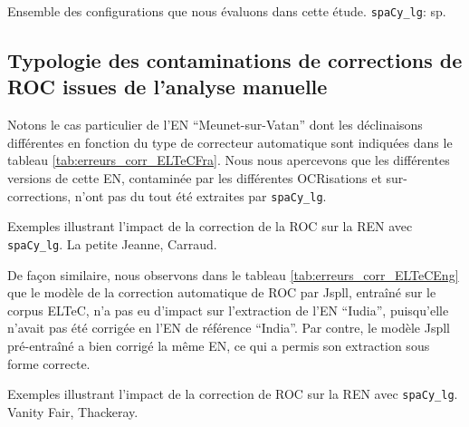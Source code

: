 \begin{table}[h!]
    \centering
   
    \caption{Ensemble des configurations que nous évaluons dans cette étude. \texttt{spaCy\_lg}: sp.}
    \label{tab:config}
\end{table}

\subsection{Typologie des contaminations de corrections de ROC issues de l'analyse manuelle}
\label{subsec:Typologie_COR-OCR-IMPACT-NER}

Notons le cas particulier de l'EN ``Meunet-sur-Vatan'' dont les déclinaisons différentes en fonction du type de correcteur automatique sont indiquées dans le tableau \ref{tab:erreurs_corr_ELTeCFra}. Nous nous apercevons que les différentes versions de cette EN, contaminée par les différentes OCRisations et sur-corrections, n'ont pas du tout été extraites par \texttt{spaCy\_lg}.

\begin{table}[h!]
    \small
    \centering
   
     \caption{Exemples illustrant l'impact de la correction de la ROC sur la REN avec \texttt{spaCy\_lg}. {\normalfont La petite Jeanne}, Carraud.}
    \label{tab:erreurs_corr_ELTeCFra}
\end{table}

De façon similaire, nous observons dans le tableau \ref{tab:erreurs_corr_ELTeCEng} que le modèle de la correction automatique de ROC par Jspll, entraîné sur le corpus ELTeC, n'a pas eu d'impact sur l'extraction de l'EN ``Iudia'', puisqu'elle n'avait pas été corrigée en l'EN de référence ``India''. Par contre, le modèle Jspll pré-entraîné a bien corrigé la même EN, ce qui a permis son extraction sous forme correcte.
\begin{table}[h!]
\small
    \centering
   
    \caption{Exemples illustrant l'impact de la correction de ROC sur la REN avec \texttt{spaCy\_lg}. {\normalfont Vanity Fair}, Thackeray.}
    \label{tab:erreurs_corr_ELTeCEng}
\end{table}



